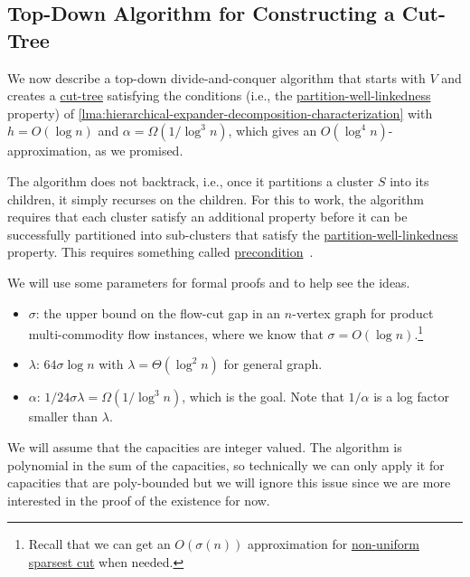 \subsection{Top-Down Algorithm for Constructing a Cut-Tree}
We now describe a top-down divide-and-conquer algorithm that starts with \(V\) and creates a \hyperref[def:cut-tree]{cut-tree} satisfying the conditions (i.e., the \hyperref[def:partition-and-boundary-well-linked]{partition-well-linkedness} property) of \autoref{lma:hierarchical-expander-decomposition-characterization} with \(h = O(\log n)\) and \(\alpha = \Omega (1 / \log ^3 n)\), which gives an \(O(\log ^4 n)\)-approximation, as we promised.

The algorithm does not backtrack, i.e., once it partitions a cluster \(S\) into its children, it simply recurses on the children. For this to work, the algorithm requires that each cluster satisfy an additional property before it can be successfully partitioned into sub-clusters that satisfy the \hyperref[def:partition-and-boundary-well-linked]{partition-well-linkedness} property. This requires something called \hyperref[def:precondition]{precondition}~\cite{bienkowski2003practical}.

\begin{notation}[Parameter]
	We will use some parameters for formal proofs and to help see the ideas.
	\begin{itemize}
		\item \(\sigma \): the upper bound on the flow-cut gap in an \(n\)-vertex graph for product multi-commodity flow instances, where we know that \(\sigma = O(\log n)\).\footnote{Recall that we can get an \(O(\sigma (n))\) approximation for \hyperref[prb:non-uniform-sparsest-cut]{non-uniform sparsest cut} when needed.}
		\item \(\lambda \): \(64 \sigma \log n\) with \(\lambda = \Theta (\log ^2 n)\) for general graph.
		\item \(\alpha \): \(1 / 24 \sigma \lambda = \Omega (1 / \log ^3 n)\), which is the goal. Note that \(1 / \alpha \) is a log factor smaller than \(\lambda \).
	\end{itemize}
\end{notation}

We will assume that the capacities are integer valued. The algorithm is polynomial in the sum of the capacities, so technically we can only apply it for capacities that are poly-bounded but we will ignore this issue since we are more interested in the proof of the existence for now.

